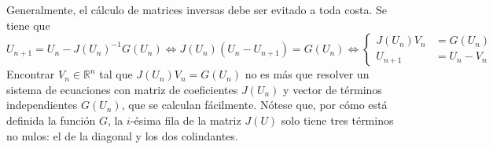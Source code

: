 \documentclass[11pt]{report}
\theoremstyle{mytheorem}
\theoremstyle{mydefinition}
\theoremstyle{myexample}
\newcommand{\R}{\mathbb R}
\newcommand{\C}{\mathbb C}
\newcommand{\comment}[1]{}
\begin{document}
Generalmente, el cálculo de matrices inversas debe ser evitado a toda costa. Se tiene que
\[U_{n+1} = U_n  - J(U_n)^{-1}G(U_n) \iff J(U_n)(U_n-U_{n+1})=G(U_n) \iff \left\{ \begin{alignedat}{1}
    J(U_n)V_n &= G(U_n) \\
    U_{n+1} &= U_n-V_n
\end{alignedat}\right.\]
Encontrar $V_n \in \R^n$ tal que $J(U_n)V_n = G(U_n)$ no es más que resolver un sistema de ecuaciones con matriz de coeficientes $J(U_n)$ y vector de términos independientes $G(U_n)$, que se calculan fácilmente. Nótese que, por cómo está definida la función $G$, la $i$-ésima fila de la matriz $J(U)$ solo tiene tres términos no nulos: el de la diagonal y los dos colindantes.

\comment{
\section{Problemas rígidos}

\subsection{Ecuación lineal no homogénea}

Considérese el problema
\[\left\{\begin{alignedat}{1}
    y'(t)&=\lambda y(t)+a, \\
    y(0)&=y_0,
\end{alignedat}\right.\]
para ciertos $y_0,a \in \R$, $\lambda \in \C^-$. La única solución de este problema es
\[y(t) = -\frac{a}{\lambda}+ce^{\lambda t}, \quad t \in \R\]
para una cierta constante $c \in \R$ que no nos interesamos en explicitar. Se tiene que
\[\lim_{t \to \infty} y(t) = -\frac{a}{\lambda},\]
luego cabe esperar que para cualquier método numérico se verifique
\[\lim_{k \to \infty} = -\frac{a}{\lambda} \iff \lambda h \in D_A\]
Veamos que esto es cierto para los métodos de Runge-Kutta. Estos métodos aplicados al problema que nos ocupa toman la forma
\[\left\{\begin{alignedat}{1}
    y_k^{(i)} &= y_k+h\sum_{j=1}^s a_{i,j}\left(\lambda y_k^{(j)}+a\right), \quad i \in 1,\mathellipsis,s, \\
    y_{k+1} &= y_k+h\sum_{i=1}^s b_i\left(\lambda y_k^{(i)}+a\right)
\end{alignedat}\right.\]
Si llamamos $z = y+\frac{a}{\lambda}$, se tiene que $y'=\lambda y+a$ si y solo si $z' = \lambda z$. Pongamos entonces $z_k = y_k+\frac{a}{\lambda}$, $z_k^{(i)} = y_k^{(i)}+\frac{a}{\lambda}$, $i \in \{1,\mathellipsis,s\}$. Entonces
\[\left\{\begin{alignedat}{1}
    z_k^{(i)} &= z_k+h\sum_{j=1}^s a_{i,j}\lambda z_k^{(j)}, \quad i \in 1,\mathellipsis,s, \\
    z_{k+1} &= z_k+h\sum_{i=1}^s b_i\lambda z_k^{(i)}
\end{alignedat}\right.\]
En este caso, se sabe que
\[\lim_{k \to \infty} z_k = 0 \iff h\lambda \in D_A\]
No hay más que observar que, independientemente del dato inicial del problema,
\[\lim_{k \to \infty} y_k = -\frac{a}{\lambda} \iff \lim_{k \to \infty} z_k = 0,\]
de donde
\[\lim_{k \to \infty} y_k = -\frac{a}{\lambda} \iff h \lambda \in D_A\]

}
\end{document}
